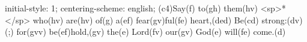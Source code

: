 initial-style: 1;
centering-scheme: english;
(c4)Say(f) to(gh) them(hv) <sp>*</sp> who(hv) are(hv) of(g) a(ef) fear(gv)ful(fe) heart,(ded) Be(cd) strong:(dv) (;) for(gvv) be(ef)hold,(gv) the(e) Lord(fv) our(gv) God(e) will(fe) come.(d)
